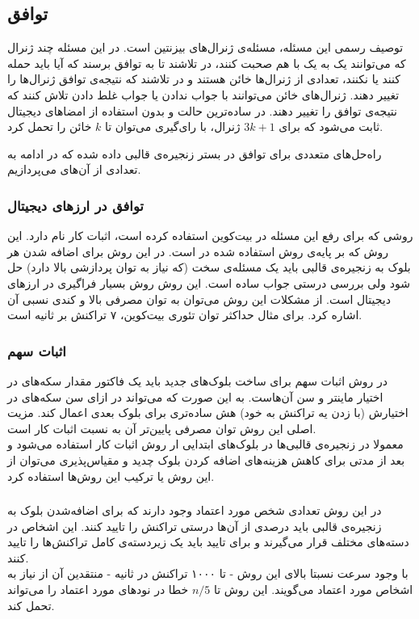 \subsection{توافق}
توصیف رسمی این مسئله، مسئله‌ی ژنرال‌های بیزنتین 
\cite{byzantine}
است. در این مسئله چند ژنرال که می‌توانند یک به یک با هم صحبت کنند، در تلاشند تا به توافق برسند که آیا باید حمله کنند یا نکنند، تعدادی از ژنرال‌ها خائن هستند و در تلاشند که نتیجه‌ی توافق ژنرال‌ها را تغییر دهند. ژنرال‌های خائن می‌توانند با جواب ندادن یا جواب غلط دادن تلاش کنند که نتیجه‌ی توافق را تغییر دهند. در ساده‌ترین حالت و بدون استفاده از امضا‌های دیجیتال ثابت می‌شود که برای $ 3k + 1 $ ژنرال، با رای‌گیری می‌توان تا $ k $ خائن را تحمل کرد. 
\par
راه‌حل‌های متعددی برای توافق 
در بستر زنجیره‌ی قالبی داده شده که در ادامه به تعدادی از آن‌های می‌پردازیم.
\subsubsection{توافق در ارزهای دیجیتال}
روشی که 
\cite{bitcoin}
برای رفع این مسئله در بیت‌کوین استفاده کرده است، اثبات کار 
نام دارد. این روش که بر پایه‌ی روش استفاده شده در 
\cite{hashcash}
است. در این روش برای اضافه شدن هر بلوک به زنجیره‌ی قالبی باید یک مسئله‌ی سخت (که نیاز به توان پردازشی بالا دارد) حل شود ولی بررسی درستی جواب ساده است. این روش روش بسیار فراگیری در ارز‌های دیجیتال است. از مشکلات این روش می‌توان به توان مصرفی بالا و کندی نسبی آن اشاره کرد. برای مثال حداکثر توان تئوری بیت‌کوین، ۷ تراکنش بر ثانیه است. 
\subsubsection{اثبات سهم}
در روش اثبات سهم
\cite{PoS}
برای ساخت بلوک‌های جدید باید یک فاکتور مقدار سکه‌های در اختیار ماینتر و سن آن‌هاست. به این صورت که می‌تواند در ازای سن‌ سکه‌های در اختیارش (با زدن یه تراکنش به خود) هش ساده‌تری برای بلوک بعدی اعمال کند. مزیت اصلی این روش توان مصرفی پایین‌تر آن به نسبت اثبات کار است. 
\\
معمولا در زنجیره‌ی قالبی‌ها در بلوک‌های ابتدایی ار روش اثبات کار استفاده می‌شود و بعد از مدتی برای کاهش هزینه‌های اضافه کردن بلوک چدید و مقیاس‌پذیری می‌توان از این روش یا ترکیب این روش‌ها استفاده کرد.

\subsubsection{}
در این روش
\cite{ripple} \cite{ripple2}
 تعدادی شخص مورد اعتماد وجود دارند که برای اضافه‌شدن بلوک به زنجیره‌ی قالبی باید درصدی از آن‌ها درستی تراکنش را تایید کنند. این اشخاص در دسته‌های مختلف قرار می‌گیرند و برای تایید باید یک زیردسته‌ی کامل تراکنش‌ها را تایید کنند.
 \\
 با وجود سرعت نسبتا بالای این روش - تا ۱۰۰۰ تراکنش در ثانیه - منتقدین آن از نیاز به اشخاص مورد اعتماد می‌گویند. این روش تا $ n /5 $ خطا در نود‌های مورد اعتماد را می‌تواند تحمل کند.


